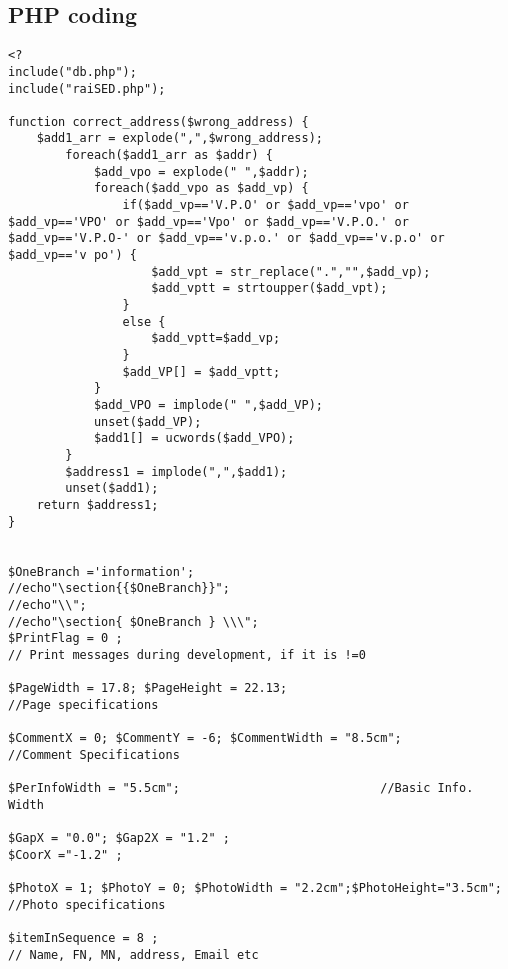\subsection{}
\subsection{PHP coding}
\begin{verbatim}
<?
include("db.php");
include("raiSED.php");

function correct_address($wrong_address) {
	$add1_arr = explode(",",$wrong_address);
		foreach($add1_arr as $addr) {
			$add_vpo = explode(" ",$addr);
			foreach($add_vpo as $add_vp) {
				if($add_vp=='V.P.O' or $add_vp=='vpo' or $add_vp=='VPO' or $add_vp=='Vpo' or $add_vp=='V.P.O.' or $add_vp=='V.P.O-' or $add_vp=='v.p.o.' or $add_vp=='v.p.o' or $add_vp=='v po') {
					$add_vpt = str_replace(".","",$add_vp);
					$add_vptt = strtoupper($add_vpt);
				}
				else {
					$add_vptt=$add_vp;
				}
				$add_VP[] = $add_vptt;
			}
			$add_VPO = implode(" ",$add_VP);
			unset($add_VP);
			$add1[] = ucwords($add_VPO);
		}
		$address1 = implode(",",$add1);
		unset($add1);
	return $address1;
}


$OneBranch ='information';
//echo"\section{{$OneBranch}}";
//echo"\\";
//echo"\section{ $OneBranch } \\\";
$PrintFlag = 0 ;                                                         // Print messages during development, if it is !=0

$PageWidth = 17.8; $PageHeight = 22.13;                                     //Page specifications

$CommentX = 0; $CommentY = -6; $CommentWidth = "8.5cm";               //Comment Specifications

$PerInfoWidth = "5.5cm";						    //Basic Info. Width

$GapX = "0.0"; $Gap2X = "1.2" ;
$CoorX ="-1.2" ;

$PhotoX = 1; $PhotoY = 0; $PhotoWidth = "2.2cm";$PhotoHeight="3.5cm";   //Photo specifications

$itemInSequence = 8 ;                                                  // Name, FN, MN, address, Email etc


\end{verbatim}
